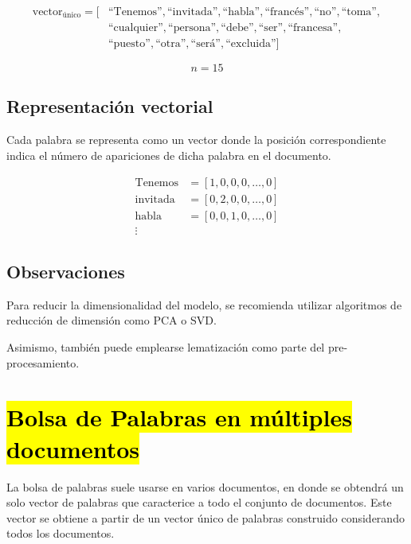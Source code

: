\documentclass[12pt]{article}
\begin{document}
\begin{equation}
\begin{aligned}
\text{vector}_{\text{único}} = [&\text{``Tenemos''}, \text{``invitada''}, \text{``habla''}, \text{``francés''}, \text{``no''}, \text{``toma''}, \\
&\text{``cualquier''}, \text{``persona''}, \text{``debe''}, \text{``ser''}, \text{``francesa''}, \\
&\text{``puesto''}, \text{``otra''}, \text{``será''}, \text{``excluida''}]
\end{aligned}
\end{equation}

\begin{equation}
n = 15
\end{equation}

\subsection*{Representación vectorial}

Cada palabra se representa como un vector donde la posición correspondiente indica el número de apariciones de dicha palabra en el documento.

\begin{align}
\text{Tenemos} &= [1, 0, 0, 0, \ldots, 0] \\
\text{invitada} &= [0, 2, 0, 0, \ldots, 0] \\
\text{habla} &= [0, 0, 1, 0, \ldots, 0] \\
\vdots &
\end{align}

\subsection*{Observaciones}

Para reducir la dimensionalidad del modelo, se recomienda utilizar algoritmos de reducción de dimensión como PCA o SVD.

Asimismo, también puede emplearse lematización como parte del pre-procesamiento.

\section*{\hl{Bolsa de Palabras en múltiples documentos}}

La bolsa de palabras suele usarse en varios documentos, en donde se obtendrá un solo vector de palabras que caracterice a todo el conjunto de documentos.  
Este vector se obtiene a partir de un vector único de palabras construido considerando todos los documentos.
\end{document}
